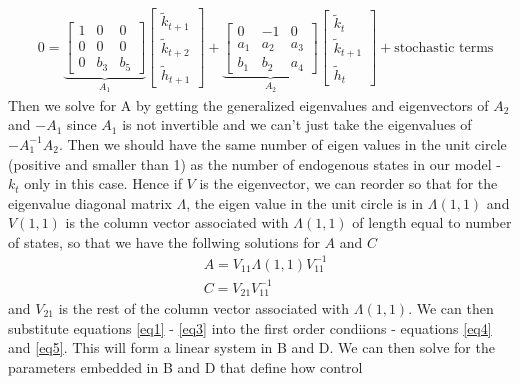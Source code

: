 \documentclass{article} %
\begin{document}
\begin{align*}
& 0  = 
\underbrace{\left[ \begin{array}{ccc}
                 1 & 0 & 0 \\
                 0 & 0 & 0 \\
                 0 & b_3 & b_5
       \end{array} \right]}_{A_1}
\left[ \begin{array}{c}
                 \tilde{k}_{t+1} \\
                 \tilde{k}_{t+2} \\
                 \tilde{h}_{t+1}
       \end{array} \right] +
\underbrace{\left[ \begin{array}{ccc}
                 0 & -1 & 0 \\
                 a_1 & a_2 & a_3 \\
                 b_1 & b_2 & a_4
       \end{array} \right]}_{A_2}
\left[ \begin{array}{c}
                 \tilde{k}_{t} \\
                 \tilde{k}_{t+1} \\
                 \tilde{h}_{t}
       \end{array} \right] + \text{stochastic terms}
\end{align*}
Then we solve for A by getting the generalized eigenvalues and
eigenvectors of $A_2$ and $-A_1$ since $A_1$ is not invertible and we
can't just take the eigenvalues of $-A_1^{-1} A_2$. Then we should
have the same number of eigen values in the unit circle (positive and
smaller than 1) as the number of endogenous states in our model -
$k_t$ only in this case. Hence if $V$ is the eigenvector, we can
reorder so that for the eigenvalue diagonal matrix $\Lambda$, the
eigen value in the unit circle is in $\Lambda(1,1)$ and $V(1,1)$ is
the column vector associated with $\Lambda(1,1)$ of length equal to
number of states, so that we have the follwing solutions for $A$ and
$C$
\begin{align*}
  & A = V_{11} \Lambda(1,1) V_{11}^{-1} \\
  & C = V_{21} V_{11}^{-1}
\end{align*}
and $V_{21}$ is the rest of the column vector associated with
$\Lambda(1,1)$. We can then substitute equations \ref{eq1} - \ref{eq3}
into the first order condiions - equations \ref{eq4} and
\ref{eq5}. This will form a linear system in B and D. We can then
solve for the parameters embedded in B and D that define how control
\end{document}
